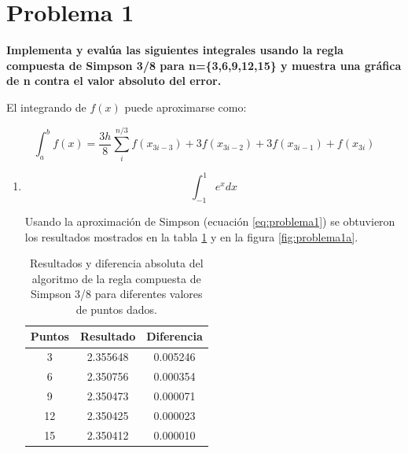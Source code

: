 \section*{Problema 1}

\textbf{Implementa y evalúa las siguientes integrales usando la regla compuesta de Simpson 3/8 para n=\{3,6,9,12,15\} y muestra una gráfica de n contra el valor absoluto del error.}

El integrando de $f(x)$ puede aproximarse como:

\begin{equation}
    \int_{a}^b f(x) = \frac{3h}{8} \sum_i^{n/3}  f(x_{3i-3})+3f(x_{3i-2})+3f(x_{3i-1}) +f(x_{3i}) \label{eq:problema1}
\end{equation}

\begin{enumerate}
    \item \begin{equation}
              \int_{-1}^1 e^x dx \label{eq:problema1a}
          \end{equation}

          Usando la aproximación de Simpson (ecuación \ref{eq:problema1}) se obtuvieron los resultados mostrados en la tabla \ref{table:problema1a} y en la figura \ref{fig:problema1a}.

          \begin{table}[H]
              \centering
              \begin{tabular}{ccc} \hline
                  \textbf{Puntos} & \textbf{Resultado} & \textbf{Diferencia} \\ \hline
                  3               & 2.355648           & 0.005246            \\
                  6               & 2.350756           & 0.000354            \\
                  9               & 2.350473           & 0.000071            \\
                  12              & 2.350425           & 0.000023            \\
                  15              & 2.350412           & 0.000010            \\ \hline
              \end{tabular}
              \caption{Resultados y diferencia absoluta del algoritmo de la regla compuesta de Simpson 3/8 para diferentes valores de puntos dados.}
              \label{table:problema1a}
          \end{table}


\end{enumerate}
